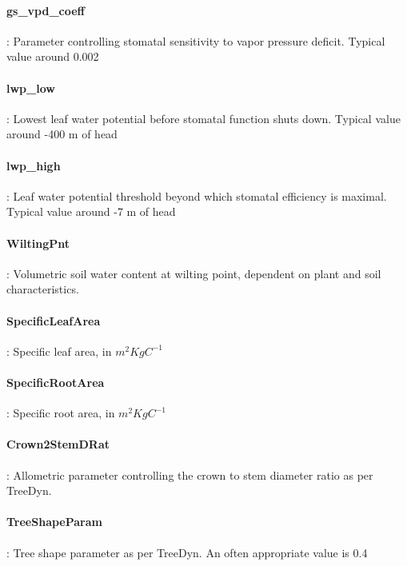 \hangindent=0.7cm
\paragraph{gs\_vpd\_coeff}: Parameter controlling stomatal sensitivity to vapor pressure deficit. Typical value around 0.002

\hangindent=0.7cm
\paragraph{lwp\_low}: Lowest leaf water potential before stomatal function shuts down. Typical value around -400 m of head

\hangindent=0.7cm
\paragraph{lwp\_high}: Leaf water potential threshold beyond which stomatal efficiency is maximal. Typical value around -7 m of head

\hangindent=0.7cm
\paragraph{WiltingPnt}: Volumetric soil water content at wilting point, dependent on plant and soil characteristics. 

\hangindent=0.7cm
\paragraph{SpecificLeafArea}: Specific leaf area, in $m^2KgC^{-1}$

\hangindent=0.7cm
\paragraph{SpecificRootArea}: Specific root area, in $m^2KgC^{-1}$

\hangindent=0.7cm
\paragraph{Crown2StemDRat}: Allometric parameter controlling the crown to stem diameter ratio as per TreeDyn. 

\hangindent=0.7cm
\paragraph{TreeShapeParam}: Tree shape parameter as per TreeDyn. An often appropriate value is 0.4

\hangindent=0.7cm
